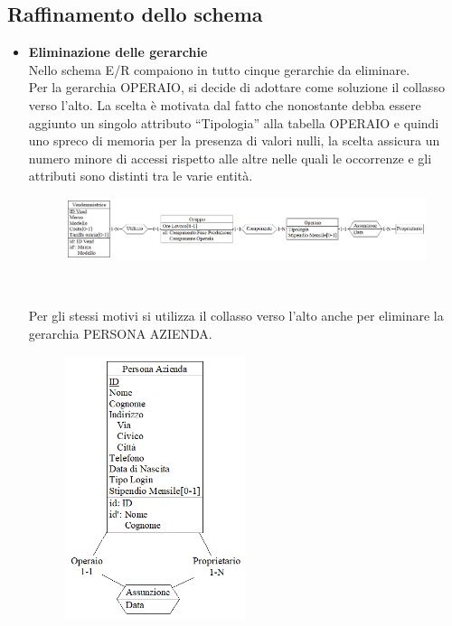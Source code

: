 \documentclass{article}
\begin{document}
\subsection{Raffinamento dello schema}
\begin{itemize}
\item \textbf{Eliminazione delle gerarchie} \\
Nello schema E/R compaiono in tutto cinque gerarchie da eliminare.\\
\newline
Per la gerarchia OPERAIO, si decide di adottare come soluzione il collasso verso l'alto. La scelta è motivata dal fatto che nonostante debba essere aggiunto un singolo attributo “Tipologia” alla tabella OPERAIO e quindi uno spreco di memoria per la presenza di valori nulli, la scelta assicura un numero minore di accessi rispetto alle altre nelle quali le occorrenze e gli attributi sono distinti tra le varie entità.\\
\begin{figure}[htbp]
\centering
\includegraphics[width=1\textwidth]{img/eliminazione_ger_Operaio.png}
\end{figure}\\\newline\newline

Per gli stessi motivi si utilizza il collasso verso l’alto anche per eliminare la gerarchia PERSONA AZIENDA.
\begin{figure}[htbp]
\centering
\includegraphics[width=0.5\textwidth]{img/eliminazione_ger_PersonaAzienda.png}
\end{figure}\\\newline\newline


\end{itemize}
\end{document}

